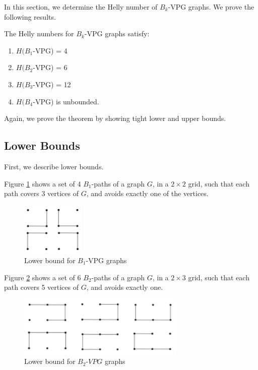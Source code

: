 In this section, we determine the Helly number of $B_k$-VPG graphs. We prove the following results.
\begin{theorem}\label{thm:Bk-VPG}
The Helly numbers for $B_k$-VPG graphs satisfy:
\begin{enumerate}
\item $H(B_1$-VPG) = 4
\item $H(B_2$-VPG) = 6
\item $H(B_3$-VPG) = 12
\item $H(B_4$-VPG) is unbounded.
\end{enumerate}
\end{theorem}

Again, we prove the theorem by showing tight lower and upper bounds.

\subsection{Lower Bounds}

First, we describe lower bounds.

Figure \ref{VPG:lower-B1} shows a set of 4 $B_1$-paths of a graph $G$, in a $2 \times 2$ grid, such that each path covers 3  vertices of $G$, and avoids exactly one of the  vertices. 

\begin{figure}[!h]
    \centering
    \includegraphics[width=3cm]{./img/lower-bound-B1-VPG.pdf}
    \caption{Lower bound for $B_1$-VPG graphs}
    \label{VPG:lower-B1}
\end{figure}

Figure \ref{VPG:lower-B2} shows a set of 6 $B_2$-paths of a graph $G$, in a $2 \times 3$ grid, such that each path covers 5  vertices of $G$, and avoids exactly one. 


\begin{figure}[!h]
    \centering
    \includegraphics[width=8cm]{./img/lower-bound-B2-VPG.pdf}
    \caption{Lower bound for $B_2$-$VPG$ graphs}
    \label{VPG:lower-B2}
\end{figure}



